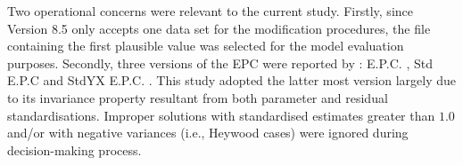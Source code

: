 Two operational concerns were relevant to the current study. Firstly, since \cM Version 8.5 only accepts one data set for the modification procedures, the file containing the first plausible value was selected for the model evaluation purposes. Secondly, three versions of the EPC were reported by \CM: \textsf{E.P.C.} \citep{saris:1987}, \textsf{Std E.P.C} \citep{kaplan:1989} and \textsf{StdYX E.P.C.} \citep{chou:1993}. This study adopted the latter most version largely due to its invariance property resultant from both parameter and residual standardisations. Improper solutions with standardised estimates greater than $1.0$ and/or with negative variances (i.e., Heywood cases) were ignored during decision-making process.
